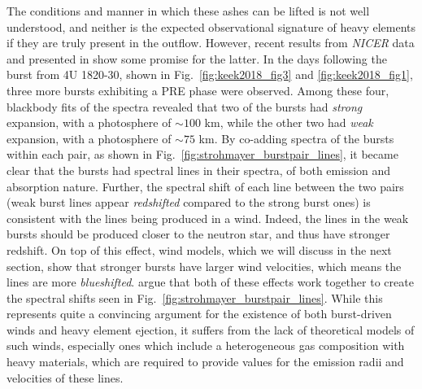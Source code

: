 \documentclass[../main.tex]{subfiles}
\newcommand{\Nicer}{\textit{NICER}}
\begin{document}
The conditions and manner in which these ashes can be lifted is not well understood, and neither is the expected observational signature of heavy elements if they are truly present in the outflow. However, recent results from \Nicer {} data and presented in \citet{Strohmayer2019} show some promise for the latter. In the days following the burst from 4U 1820-30, shown in Fig.~\ref{fig:keek2018_fig3} and \ref{fig:keek2018_fig1}, three more bursts exhibiting a PRE phase were observed. Among these four, blackbody fits of the spectra revealed that two of the bursts had \textit{strong} expansion, with a photosphere of $\sim 100$ km, while the other two had \textit{weak} expansion, with a photosphere of $\sim 75$ km. By co-adding spectra of the bursts within each pair, as shown in Fig.~\ref{fig:strohmayer_burstpair_lines}, it became clear that the bursts had spectral lines in their spectra, of both emission and absorption nature. Further, the spectral shift of each line between the two pairs (weak burst lines appear \textit{redshifted} compared to the strong burst ones) is consistent with the lines being produced in a wind. Indeed, the lines in the weak bursts should be produced closer to the neutron star, and thus have stronger redshift. On top of this effect, wind models, which we will discuss in the next section, show that stronger bursts have larger wind velocities, which means the lines are more \textit{blueshifted}. \citet{Strohmayer2019} argue that both of these effects work together to create the spectral shifts seen in Fig.~\ref{fig:strohmayer_burstpair_lines}. While this represents quite a convincing argument for the existence of both burst-driven winds and heavy element ejection, it suffers from the lack of theoretical models of such winds, especially ones which include a heterogeneous gas composition with heavy materials, which are required to provide values for the emission radii and velocities of these lines.\\
\end{document}
